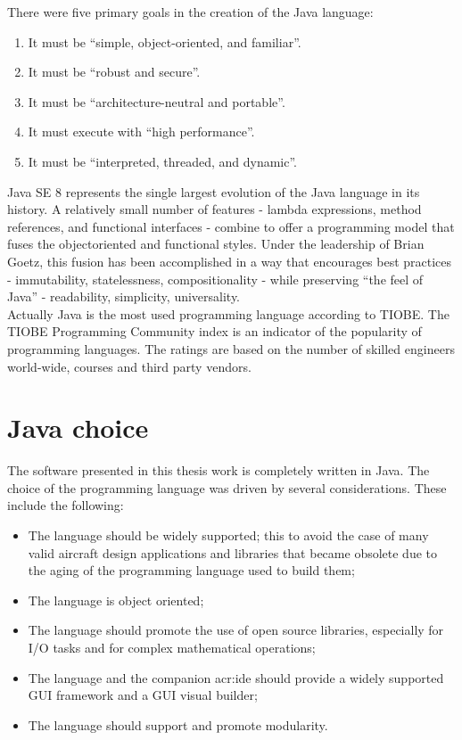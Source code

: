 There were five primary goals in the creation of the Java language:\cite{java}
\begin{enumerate}
\item It must be ``simple, object-oriented, and familiar''.
\item It must be ``robust and secure''.
\item It must be ``architecture-neutral and portable''.
\item It must execute with ``high performance''.
\item It must be ``interpreted, threaded, and dynamic''.
\end{enumerate}
Java SE 8 represents the single largest evolution of the Java language in its history. A relatively small number of features - lambda expressions, method references, and functional interfaces - combine to offer a programming model that fuses the objectoriented
and functional styles. Under the leadership of Brian Goetz, this fusion has been accomplished in a way that encourages best practices - immutability, statelessness, compositionality - while preserving ``the feel of Java'' - readability, simplicity, universality.\\
Actually Java is the most used programming language according to TIOBE. The TIOBE Programming Community index is an indicator of the popularity of programming languages. The ratings are based on the number of skilled engineers world-wide, courses and third party vendors.


\section{Java choice}

The software presented in this thesis work is completely written in Java. The choice of the programming language was driven by several considerations. These include the following:

\begin{itemize}
\item The language should be widely supported; this to avoid the case of many valid aircraft design applications and libraries that became obsolete due to the aging of the programming language used to build them;
\item The language is object oriented;
\item The language should promote the use of open source libraries, especially for I/O tasks and for complex mathematical operations;
\item The language and the companion \gls{acr:ide} should provide a widely supported \gls{GUI} framework and a \gls{GUI} visual builder;
\item The language should support and promote modularity.
\end{itemize}


